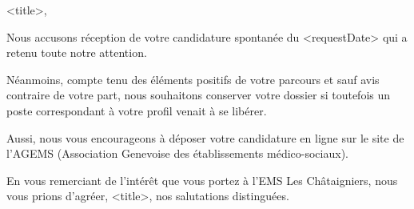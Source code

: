 \documentclass[a4paper, 12pt]{letter}
\begin{document}


<title>,

Nous accusons réception de votre candidature spontanée du <requestDate> qui a retenu toute notre attention.

Néanmoins, compte tenu des éléments positifs de votre parcours et sauf avis contraire de votre part, nous souhaitons conserver votre dossier si toutefois un poste correspondant à votre profil venait à se libérer.

Aussi, nous vous encourageons à déposer votre candidature en ligne sur le site de l’AGEMS (Association Genevoise des établissements médico-sociaux).

En vous remerciant de l’intérêt que vous portez à l’EMS Les Châtaigniers, nous vous prions d’agréer, <title>, nos salutations distinguées.


\end{document}
